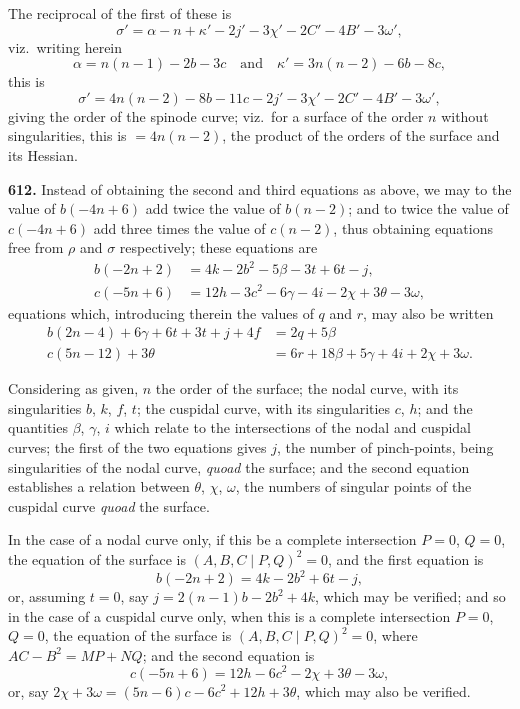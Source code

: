 \documentclass[11pt,a4paper]{article}
\newcommand{\artno}[1]{\textbf{#1.}\quad}
\begin{document}
The reciprocal of the first of these is
\[
  \sigma' = \alpha - n + \kappa' - 2j' - 3\chi' - 2C' - 4B' - 3\omega',
\]
viz.\ writing herein
\[
  \alpha = n(n-1) - 2b - 3c \quad \text{and} \quad \kappa' = 3n(n-2) - 6b - 8c,
\]
this is
\[
  \sigma' = 4n(n-2) - 8b - 11c - 2j' - 3\chi' - 2C' - 4B' - 3\omega',
\]
giving the order of the spinode curve; viz.\ for a surface of the order $n$
without singularities, this is $= 4n(n-2)$, the product of the orders of the
surface and its Hessian.

\artno{612} Instead of obtaining the second and third equations as above, we
may to the value of $b(-4n + 6)$ add twice the value of $b(n-2)$; and to
twice the value of $c(-4n + 6)$ add three times the value of $c(n-2)$, thus
obtaining equations free from $\rho$ and $\sigma$ respectively; these
equations are
\begin{align*}
  b(-2n + 2) & = 4k - 2b^{2} - 5\beta - 3t + 6t - j, \\
  c(-5n + 6) & = 12h - 3c^{2} - 6\gamma - 4i - 2\chi + 3\theta - 3\omega,
\end{align*}
equations which, introducing therein the values of $q$ and $r$, may also be
written
\begin{align*}
  b(2n - 4) + 6\gamma + 6t + 3t + j + 4f & = 2q + 5\beta \\
  c(5n - 12) + 3\theta & = 6r + 18\beta + 5\gamma + 4i + 2\chi + 3\omega.
\end{align*}

Considering as given, $n$ the order of the surface; the nodal curve, with its
singularities $b$, $k$, $f$, $t$; the cuspidal curve, with its singularities
$c$, $h$; and the quantities $\beta$, $\gamma$, $i$ which relate to the
intersections of the nodal and cuspidal curves; the first of the two
equations gives $j$, the number of pinch-points, being singularities of the
nodal curve, \emph{quoad} the surface; and the second equation establishes a
relation between $\theta$, $\chi$, $\omega$, the numbers of singular points
of the cuspidal curve \emph{quoad} the surface.

In the case of a nodal curve only, if this be a complete intersection $P=0$,
$Q=0$, the equation of the surface is $(A, B, C \mid P, Q)^{2} = 0$, and the
first equation is
\[
  b(-2n + 2) = 4k - 2b^{2} + 6t - j,
\]
or, assuming $t = 0$, say $j = 2(n-1)b - 2b^{2} + 4k$, which may be verified;
and so in the case of a cuspidal curve only, when this is a complete
intersection $P = 0$, $Q = 0$, the equation of the surface is
$(A, B, C \mid P, Q)^{2} = 0$, where $AC - B^{2} = MP + NQ$; and the second
equation is
\[
  c(-5n + 6) = 12h - 6c^{2} - 2\chi + 3\theta - 3\omega,
\]
or, say $2\chi + 3\omega = (5n - 6)c - 6c^{2} + 12h + 3\theta$, which may also
be verified.
\end{document}
